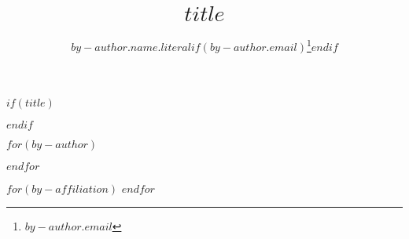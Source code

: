 
$if(title)$
\title{$title$}
$endif$

$for(by-author)$
\author[$for(by-author.affiliations/allbutlast)$$it.number$,$endfor$$for(by-author.affiliations/last)$$it.number$$endfor$]{$by-author.name.literal$$if(by-author.email)$\thanks{$by-author.email$}$endif$}
$endfor$

$for(by-affiliation)$
$endfor$

\renewcommand\Authands{ and } %